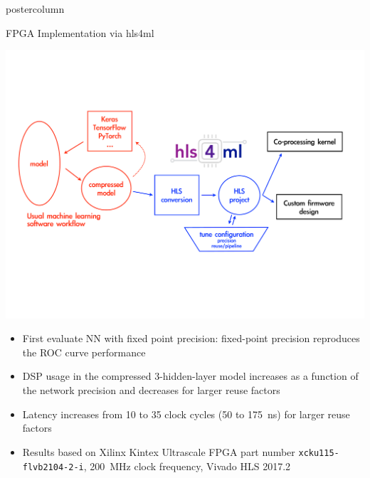\documentclass[final,hyperref={pdfpagelabels=false}]{beamer}
\newlength{\columnheight}
\begin{document}
\begin{frame}
\begin{columns}
    \begin{column}{.49\textwidth}
      \begin{beamercolorbox}[center,wd=\textwidth]{postercolumn}
        \begin{minipage}[T]{.95\textwidth} 
          \parbox[t][\columnheight]{\textwidth}{
            
            \begin{block}{FPGA Implementation via hls4ml}
             \begin{center}
                \includegraphics[width=0.8\linewidth]{flow-hls4ml.pdf}
              \end{center}
              \begin{itemize}
                \item First evaluate NN with fixed point precision:
                  {\tt <16,6>} fixed-point precision reproduces the
                  ROC curve performance
                \item DSP usage in the compressed 3-hidden-layer model
                  increases as a function of the network precision and
                  decreases for larger reuse factors
                  \item Latency increases from 10 to 35 clock cycles
                    (50 to 175~ns) for larger reuse factors
                  \item Results based on Xilinx Kintex Ultrascale FPGA part number
                    \texttt{xcku115-flvb2104-2-i}, 200~MHz clock
                    frequency, Vivado HLS 2017.2
              \end{itemize}
             

\end{block}}
\end{minipage}
\end{beamercolorbox}
\end{column}
\end{columns}
\end{frame}
\end{document}
